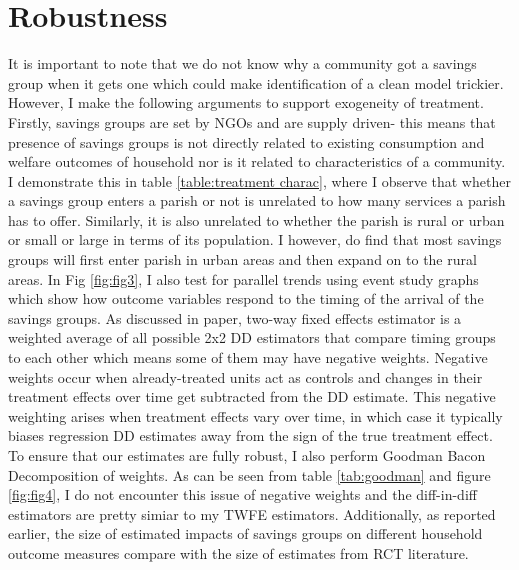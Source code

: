 \documentclass[12pt]{article}
\begin{document}
{\pagebreak
\section{Robustness}\label{sec:robustness}

\hspace{1cm} It is important to note that we do not know why a community got a savings group when it gets one which could make identification of a clean model trickier. However, I make the following arguments to support exogeneity of treatment. Firstly, savings groups are set by NGOs and are supply driven- this means that presence of savings groups is not directly related to existing consumption and welfare outcomes of household nor is it related to characteristics of a community. I demonstrate this in table \ref{table:treatment charac}, where I observe that whether a savings group enters a parish or not is unrelated to how many services a parish has to offer. Similarly, it is also unrelated to whether the parish is rural or urban or small or large in terms of its population. I however, do find that most savings groups will first enter parish in urban areas and then expand on to the rural areas. In Fig \ref{fig:fig3}, I also test for parallel trends using event study graphs which show how outcome variables respond to the timing of the arrival of the savings groups. As discussed in \cite{goodman2021difference} paper, two-way fixed effects estimator is a weighted average of all possible 2x2 DD estimators that compare timing groups to each other which means some of them may have negative weights. Negative weights occur when already-treated units act as controls and changes in their treatment effects over time get subtracted from the DD estimate. This negative weighting arises when treatment effects vary over time, in which case it typically biases regression DD estimates away from the sign of the true treatment effect. To ensure that our estimates are fully robust, I also perform Goodman Bacon Decomposition of weights. As can be seen from table \ref{tab:goodman} and figure \ref{fig:fig4}, I do not encounter this issue of negative weights and the diff-in-diff estimators are pretty simiar to my TWFE estimators. Additionally, as reported earlier, the size of estimated impacts of savings groups on different household outcome measures compare with the size of estimates from RCT literature. 

}
\end{document}
